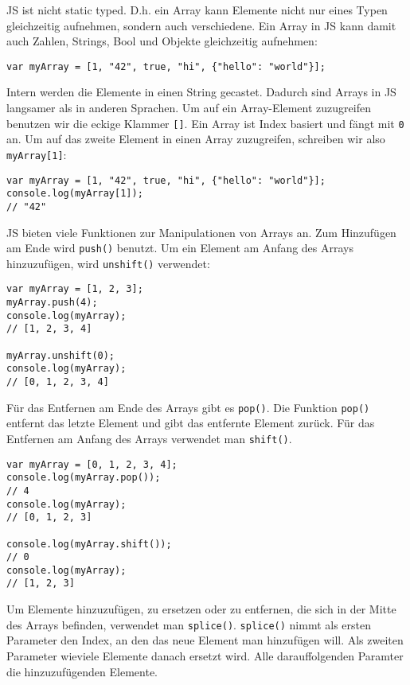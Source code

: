 \documentclass{book}
\begin{document}
JS ist nicht static typed. D.h. ein Array kann Elemente nicht nur eines Typen gleichzeitig aufnehmen, sondern auch verschiedene. Ein Array in JS kann damit auch Zahlen, Strings, Bool und Objekte gleichzeitig aufnehmen:

\begin{lstlisting}[caption=Array Konstruktor]
var myArray = [1, "42", true, "hi", {"hello": "world"}];
\end{lstlisting}

Intern werden die Elemente in einen String gecastet. Dadurch sind Arrays in JS langsamer als in anderen Sprachen. Um auf ein Array-Element zuzugreifen benutzen wir die eckige Klammer \lstinline|[]|. Ein Array ist Index basiert und fängt mit \lstinline|0| an. Um auf das zweite Element in einen Array zuzugreifen, schreiben wir also \lstinline|myArray[1]|:

\begin{lstlisting}[caption=Array Konstruktor]
var myArray = [1, "42", true, "hi", {"hello": "world"}];
console.log(myArray[1]);
// "42"
\end{lstlisting}

JS bieten viele Funktionen zur Manipulationen von Arrays an.
Zum Hinzufügen am Ende wird \lstinline|push()| benutzt. Um ein Element am Anfang des Arrays hinzuzufügen, wird \lstinline|unshift()| verwendet:

\begin{lstlisting}[caption=Array Konstruktor]
var myArray = [1, 2, 3];
myArray.push(4);
console.log(myArray); 
// [1, 2, 3, 4]

myArray.unshift(0);
console.log(myArray); 
// [0, 1, 2, 3, 4]
\end{lstlisting}

Für das Entfernen am Ende des Arrays gibt es \lstinline|pop()|. Die Funktion \lstinline|pop()| entfernt das letzte Element und gibt das entfernte Element zurück. Für das Entfernen am Anfang des Arrays verwendet man \lstinline|shift()|. 

\begin{lstlisting}[caption=Array Konstruktor]
var myArray = [0, 1, 2, 3, 4];
console.log(myArray.pop());
// 4
console.log(myArray); 
// [0, 1, 2, 3]

console.log(myArray.shift());
// 0
console.log(myArray); 
// [1, 2, 3]
\end{lstlisting}

Um Elemente hinzuzufügen, zu ersetzen oder zu entfernen, die sich in der Mitte des Arrays befinden, verwendet man \lstinline|splice()|. \lstinline|splice()| nimmt als ersten Parameter den Index, an den das neue Element man hinzufügen will. Als zweiten Parameter wieviele Elemente danach ersetzt wird. Alle darauffolgenden Paramter die hinzuzufügenden Elemente. 
\end{document}
